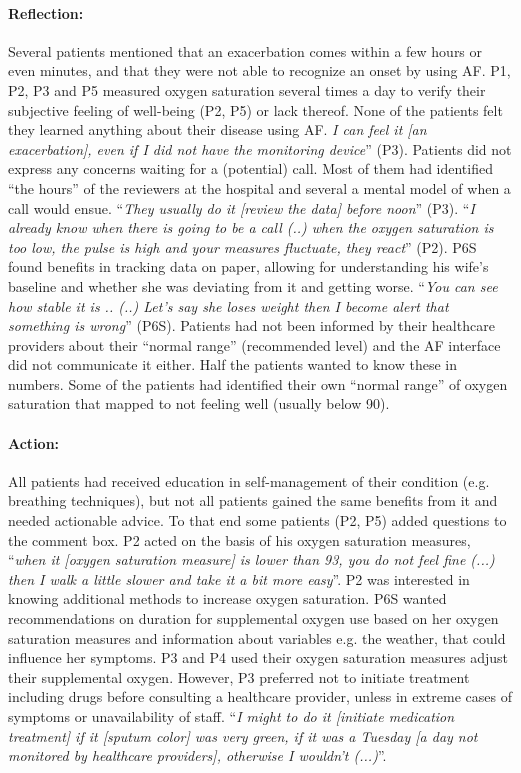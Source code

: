 \paragraph{Reflection:} 
Several patients mentioned that an exacerbation comes within a few hours or even minutes, and that they were not able to recognize an onset by using AF. P1, P2, P3 and P5 measured oxygen saturation several times a day to verify their subjective feeling of well-being (P2, P5) or lack thereof. None of the patients felt they learned anything about their disease using AF. \textit{I can feel it [an exacerbation], even if I did not have the monitoring device}” (P3). Patients did not express any concerns waiting for a (potential) call. Most of them had identified “the hours” of the reviewers at the hospital and several a mental model of when a call would ensue. “\textit{They usually do it [review the data] before noon}” (P3). “\textit{I already know when there is going to be a call (..) when the oxygen saturation is too low, the pulse is high and your measures fluctuate, they react}” (P2). P6S found benefits in tracking data on paper, allowing for understanding his wife’s baseline and whether she was deviating from it and getting worse. “\textit{You can see how stable it is .. (..) Let’s say she loses weight then I become alert that something is wrong}” (P6S). Patients had not been informed by their healthcare providers about their “normal range” (recommended level) and the AF interface did not communicate it either. Half the patients wanted to know these in numbers. Some of the patients had identified their own “normal range” of oxygen saturation that mapped to not feeling well (usually below 90). 

\paragraph{Action:} 
All patients had received education in self-management of their condition (e.g. breathing techniques), but not all patients gained the same benefits from it and needed actionable advice. To that end some patients (P2, P5) added questions to the comment box. P2 acted on the basis of his oxygen saturation measures, “\textit{when it [oxygen saturation measure] is lower than 93, you do not feel fine (...) then I walk a little slower and take it a bit more easy}”. P2 was interested in knowing additional methods to increase oxygen saturation. P6S wanted recommendations on duration for supplemental oxygen use based on her oxygen saturation measures and information about variables e.g. the weather, that could influence her symptoms. P3 and P4 used their oxygen saturation measures adjust their supplemental oxygen. However, P3 preferred not to initiate treatment including drugs before consulting a healthcare provider, unless in extreme cases of symptoms or unavailability of staff. “\textit{I might to do it [initiate medication treatment] if it [sputum color] was very green, if it was a Tuesday [a day not monitored by healthcare providers], otherwise I wouldn’t (...)}”.

